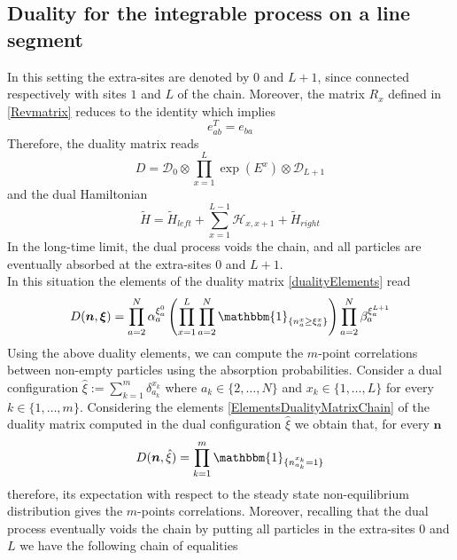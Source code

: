 \documentclass[10pt]{article}
\numberwithin{equation}{section}
\numberwithin{equation}{subsection}
\begin{document}
\subsection{Duality for the integrable process on a line segment}
In this setting the extra-sites are denoted by $0$ and $L+1$, since connected respectively with sites $1$ and $L$ of the chain. Moreover, the matrix $R_{x}$ defined in \eqref{Revmatrix} 
reduces to the identity which implies 
\begin{equation}\label{transpostionPropertyFund}
	e_{ab}^T= e_{ba}
\end{equation}
Therefore, the duality matrix reads
\begin{equation}
	D=\mathcal{D}_{0}\otimes\prod_{x=1}^{L}\exp{(E^{x})}\otimes \mathcal{D}_{L+1}
\end{equation}
and the dual Hamiltonian 
\begin{equation}
	\widetilde{H}=\widetilde{H}_{left}+\sum_{x=1}^{L-1}\mathcal{H}_{x,x+1}+\widetilde{H}_{right}
\end{equation}
In the long-time limit, the dual process voids the chain, and all particles are eventually absorbed at the extra-sites $0$ and $L+1$.\\
In this situation the elements of the duality matrix \eqref{dualityElements} read
\begin{equation}\label{ElementsDualityMatrixChain}
	D(\bm{n},\bm{\xi})=\prod_{a=2}^{N}\alpha_{a}^{\xi_{a}^{0}}\left(\prod_{x=1}^{L}\prod_{a=2}^{N}\mathbbm{1}_{\{n_{a}^{x}\geq \xi_{a}^{x}\}}\right)\prod_{a=2}^{N}\beta_{a}^{\xi_{a}^{L+1}}
\end{equation}
Using the above duality elements, we can compute the  $m$-point correlations between non-empty particles using the absorption probabilities. Consider a dual configuration $\hat{\xi}:=\sum_{k=1}^{m}\delta_{a_{k}}^{x_{k}}$ where $a_{k}\in\{2,\ldots,N\}$ and $x_{k}\in\{1,\ldots,L\}$ for every $k\in\{1,\ldots,m\}$. Considering the elements \eqref{ElementsDualityMatrixChain} of the duality matrix computed in the dual configuration $\hat{\xi}$ we obtain that, for every $\bm{n}$
\begin{equation}
	D(\bm{n},\hat{\xi})=\prod_{k=1}^{m}\mathbbm{1}_{\{n_{a_{k}}^{x_{k}}=1\}}
\end{equation}
therefore, its expectation with respect to the steady state non-equilibrium distribution gives the $m$-points correlations. Moreover, recalling that the dual process eventually voids the chain by putting all particles in the extra-sites $0$ and $L$ we have the following chain of equalities
\end{document}
